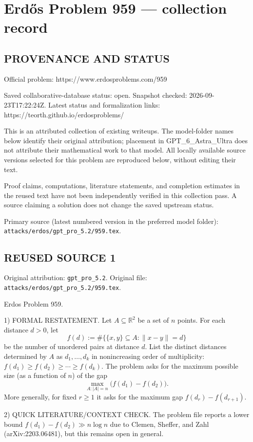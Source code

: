\section*{Erd\H{o}s Problem 959 --- collection record}

\subsection*{PROVENANCE AND STATUS}
Official problem: https://www.erdosproblems.com/959

Saved collaborative-database status: open.
Snapshot checked: 2026-09-23T17:22:24Z.
Latest status and formalization links: https://teorth.github.io/erdosproblems/

This is an attributed collection of existing writeups. The model-folder names below identify their original attribution; placement in GPT\_6\_Astra\_Ultra does not attribute their mathematical work to that model. All locally available source versions selected for this problem are reproduced below, without editing their text.

Proof claims, computations, literature statements, and completion estimates in the reused text have not been independently verified in this collection pass. A source claiming a solution does not change the saved upstream status.

Primary source (latest numbered version in the preferred model folder): \texttt{attacks/erdos/gpt\_pro\_5.2/959.tex}.

\subsection*{REUSED SOURCE 1}
Original attribution: \texttt{gpt\_pro\_5.2}.
Original file: \texttt{attacks/erdos/gpt\_pro\_5.2/959.tex}.


Erdos Problem 959.

1) FORMAL RESTATEMENT.
Let $A\subseteq\mathbb{R}^2$ be a set of $n$ points.
For each distance $d>0$, let
\[
 f(d):=\#\{\{x,y\}\subseteq A: \|x-y\|=d\}
\]
be the number of unordered pairs at distance $d$.
List the distinct distances determined by $A$ as $d_1,\dots,d_k$ in nonincreasing order of multiplicity:
$f(d_1)\ge f(d_2)\ge\cdots\ge f(d_k)$.
The problem asks for the maximum possible size (as a function of $n$) of the gap
\[
\max_{A:|A|=n}\bigl(f(d_1)-f(d_2)\bigr).
\]
More generally, for fixed $r\ge 1$ it asks for the maximum gap $f(d_r)-f(d_{r+1})$.

2) QUICK LITERATURE/CONTEXT CHECK.
The problem file reports a lower bound $f(d_1)-f(d_2)\gg n\log n$ due to Clemen, Sheffer, and Zahl (arXiv:2203.06481), but this remains open in general.

